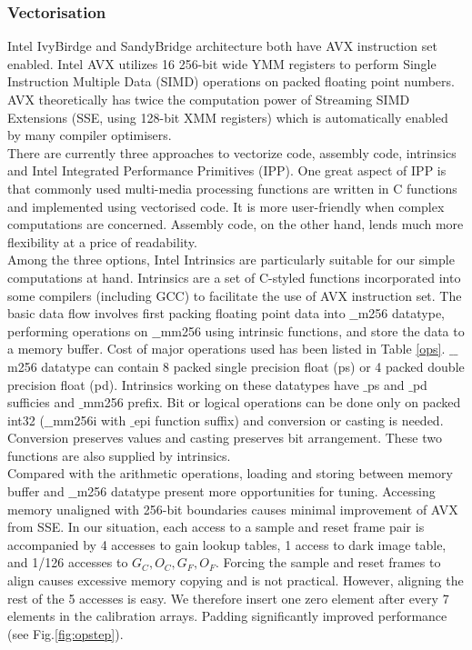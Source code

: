 \documentclass[journal]{IEEEtran}
\begin{document}
\subsubsection{Vectorisation}
\label{Vec}
Intel IvyBirdge and SandyBridge architecture both have AVX instruction set enabled. Intel AVX utilizes 16 256-bit wide YMM registers to perform Single Instruction Multiple Data (SIMD) operations on packed floating point numbers\cite{themanual}. AVX theoretically has twice the computation power of Streaming SIMD Extensions (SSE, using 128-bit XMM registers) which is automatically enabled by many compiler optimisers. \\
There are currently three approaches to vectorize code, assembly code, intrinsics and Intel Integrated Performance Primitives (IPP). One great aspect of IPP is that commonly used multi-media processing functions are written in C functions and implemented using vectorised code. It is more user-friendly when complex computations are concerned. Assembly code, on the other hand, lends much more flexibility at a price of readability. \\

Among the three options, Intel Intrinsics are particularly suitable for our simple computations at hand. Intrinsics are a set of C-styled functions incorporated into some compilers (including GCC) to facilitate the use of AVX instruction set. The basic data flow involves first packing floating point data into $\_\_$m256 datatype, performing operations on $\_\_$mm256 using intrinsic functions, and store the data to a memory buffer. Cost of major operations used has been listed in Table \ref{ops}. $\_\_$m256 datatype can contain 8 packed single precision float (ps) or 4 packed double precision float (pd). Intrinsics working on these datatypes have $\_$ps and $\_$pd sufficies and $\_$mm256 prefix. Bit or logical operations can be done only on packed int32 ($\_\_$mm256i with $\_$epi function suffix) and conversion or casting is needed. Conversion preserves values and casting preserves bit arrangement. These two functions are also supplied by intrinsics. \\

Compared with the arithmetic operations, loading and storing between memory buffer and $\_\_$m256 datatype present more opportunities for tuning. Accessing memory unaligned with 256-bit boundaries causes minimal improvement of AVX from SSE\cite{themanual}. In our situation, each access to a sample and reset frame pair is accompanied by 4 accesses to gain lookup tables, 1 access to dark image table, and 1/126 accesses to $G_C, O_C, G_F, O_F$. Forcing the sample and reset frames to align causes excessive memory copying and is not practical. However, aligning the rest of the 5 accesses is easy. We therefore insert one zero element after every 7 elements in the calibration arrays. Padding significantly improved performance (see Fig.\ref{fig:opstep}). \\
\end{document}

